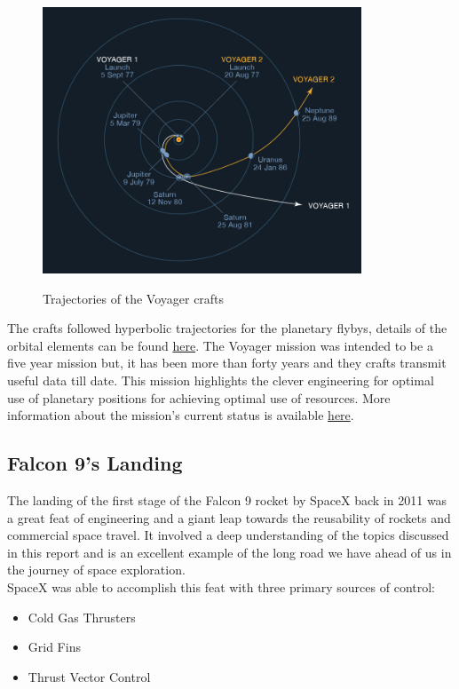 \documentclass[12pt, letterpaper]{article}
\begin{document}
\begin{figure}[H]
	\centering
    \includegraphics[height=300px]{voyager_trajectories}
    \label{fig:voyager_trajectories}
    \caption{Trajectories of the Voyager crafts}
\end{figure}

The crafts followed hyperbolic trajectories for the planetary flybys, details of the orbital elements can be found \href{https://voyager.jpl.nasa.gov/mission/science/hyperbolic-orbital-elements/}{here}. The Voyager mission was intended to be a five year mission but, it has been more than forty years and they crafts transmit useful data till date. This mission highlights the clever engineering for optimal use of planetary positions for achieving optimal use of resources. More information about the mission's current status is available \href{https://voyager.jpl.nasa.gov/mission/status/}{here}.

\subsection{Falcon 9's Landing}
The landing of the first stage of the Falcon 9 rocket by SpaceX back in 2011 was a great feat of engineering and a giant leap towards the reusability of rockets and commercial space travel. It involved a deep understanding of the topics discussed in this report and is an excellent example of the long road we have ahead of us in the journey of space exploration.\\
SpaceX was able to accomplish this feat with three primary sources of control:
\begin{itemize}
  \item Cold Gas Thrusters
  \item Grid Fins
  \item Thrust Vector Control
\end{itemize}
\end{document}
